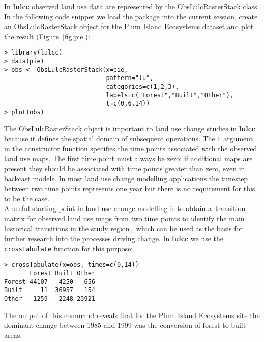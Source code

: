 \documentclass{icldt}\usepackage[]{graphicx}\usepackage[]{color}
\begin{document}
In \textbf{lulcc} observed land use data are represented by the ObsLulcRasterStack class. In the following code snippet we load the package into the current session, create an ObsLulcRasterStack object for the Plum Island Ecosystems dataset and plot the result (Figure~\ref{fig:pie}):
\begin{verbatim}
> library(lulcc)
> data(pie)
> obs <- ObsLulcRasterStack(x=pie,
                            pattern="lu",
                            categories=c(1,2,3),
                            labels=c("Forest","Built","Other"),
                            t=c(0,6,14))
> plot(obs)
\end{verbatim} 

\noindent The ObsLulcRasterStack object is important to land use change studies in \textbf{lulcc} because it defines the spatial domain of subsequent operations. The \texttt{t} argument in the constructor function specifies the time points associated with the observed land use maps. The first time point must always be zero; if additional maps are present they should be associated with time points greater than zero, even in backcast models. In most land use change modelling applications the timestep between two time points represents one year but there is no requirement for this to be the case. \\

A useful starting point in land use change modelling is to obtain a~transition matrix for observed land use maps from two time points to identify the main historical transitions in the study region \citep{pontius2004}, which can be used as the basis for further research into the processes driving change. In \textbf{lulcc} we use the \texttt{crossTabulate} function for this purpose:
\begin{verbatim}
> crossTabulate(x=obs, times=c(0,14)) 
       Forest Built Other
Forest 44107   4250   656
Built     11  36957   154 
Other   1259   2248 23921
\end{verbatim}
\noindent The output of this command reveals that for the Plum Island Ecosystems site the dominant change between 1985 and 1999 was the conversion of forest to built areas. \\
\end{document}

